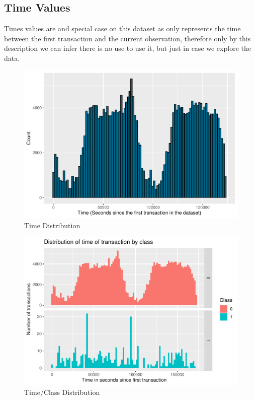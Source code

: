 \documentclass[
]{article}
\begin{document}
\hypertarget{time-values}{%
\subsection{Time Values}\label{time-values}}

Times values are and special case on this dataset as only represents the
time between the first transaction and the current observation,
therefore only by this description we can infer there is no use to use
it, but just in case we explore the data.

\begin{figure}[H]

{\centering \includegraphics[width=0.7\linewidth]{fraudDetectionReport_files/figure-latex/time_distribution-1} 

}

\caption{Time Distribution}\label{fig:time_distribution}
\end{figure}

\begin{figure}[H]

{\centering \includegraphics[width=0.7\linewidth]{fraudDetectionReport_files/figure-latex/timeClass_distribution-1} 

}

\caption{Time/Class Distribution}\label{fig:timeClass_distribution}
\end{figure}
\end{document}
